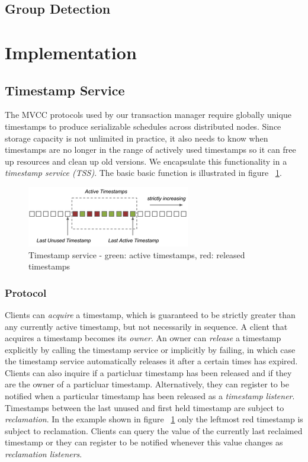 \documentclass[10pt,final,journal]{IEEEtran}
\begin{document}
\subsection{Group Detection}


\section{Implementation}

\subsection{Timestamp Service}
The MVCC protocols used by our transaction manager require globally unique timestamps to produce serializable schedules across distributed nodes. Since storage capacity is not unlimited in practice, it also needs to know when timestamps are no longer in the range of actively used timestamps so it can free up resources and clean up old versions. We encapsulate this functionality in a \emph{timestamp service (TSS)}. The basic basic function is illustrated in figure ~\ref{ts}.

\begin{figure}[!t]
\centering
\hspace*{-.2in}
\includegraphics{images/ts-resized.png}
\caption{Timestamp service - green: active timestamps, red: released timestamps}
\label{ts}
\end{figure}

\subsubsection{Protocol}
Clients can \emph{acquire} a timestamp, which is guaranteed to be strictly greater than any currently active timestamp, but not necessarily in sequence. A client that acquires a timestamp becomes its \emph{owner}. An owner can \emph{release} a timestamp explicitly by calling the timestamp service or implicitly by failing, in which case the timestamp service automatically releases it after a certain times has expired. Clients can also inquire if a particluar timestamp has been released and if they are the owner of a particluar timestamp. Alternatively, they can register to be notified when a particular timestamp has been released as a \emph{timestamp listener}. Timestamps between the last unused and first held timestamp are subject to \emph{reclamation}. In the example shown in figure ~\ref{ts} only the leftmost red timestamp is subject to reclamation. Clients can query the value of the currently last reclaimed timestamp or they can register to be notified whenever this value changes as \emph{reclamation listeners}.
\end{document}
